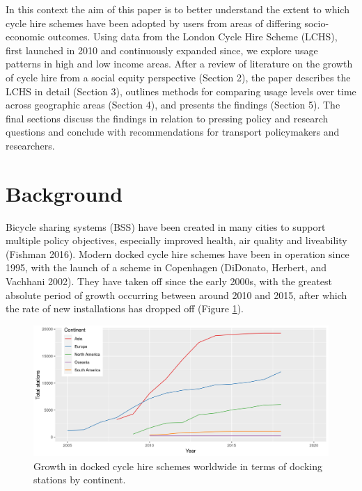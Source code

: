 \documentclass[]{article}
\begin{document}
In this context the aim of this paper is to better understand the extent to which cycle hire schemes have been adopted by users from areas of differing socio-economic outcomes.
Using data from the London Cycle Hire Scheme (LCHS), first launched in 2010 and continuously expanded since, we explore usage patterns in high and low income areas.
After a review of literature on the growth of cycle hire from a social equity perspective (Section 2), the paper describes the LCHS in detail (Section 3), outlines methods for comparing usage levels over time across geographic areas (Section 4), and presents the findings (Section 5).
The final sections discuss the findings in relation to pressing policy and research questions and conclude with recommendations for transport policymakers and researchers.

\hypertarget{background}{%
\section{Background}\label{background}}

Bicycle sharing systems (BSS) have been created in many cities to support multiple policy objectives, especially improved health, air quality and liveability (Fishman 2016).
Modern docked cycle hire schemes have been in operation since 1995, with the launch of a scheme in Copenhagen (DiDonato, Herbert, and Vachhani 2002).
They have taken off since the early 2000s, with the greatest absolute period of growth occurring between around 2010 and 2015, after which the rate of new installations has dropped off (Figure \ref{fig:global-growth}).

\begin{figure}[h]

{\centering \includegraphics[width=0.8\linewidth]{figures/bikehshare-global-stations-growth} 

}

\caption{Growth in docked cycle hire schemes worldwide in terms of docking stations by continent.}\label{fig:global-growth}
\end{figure}
\end{document}
